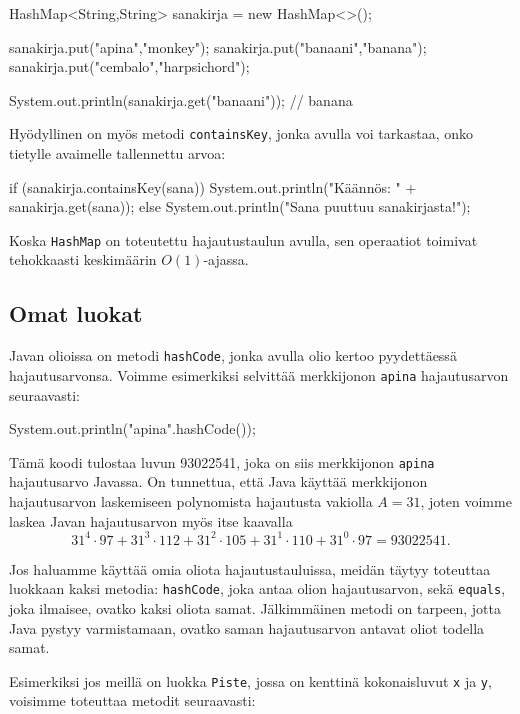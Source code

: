 \begin{code}
HashMap<String,String> sanakirja = new HashMap<>();

sanakirja.put("apina","monkey");
sanakirja.put("banaani","banana");
sanakirja.put("cembalo","harpsichord");

System.out.println(sanakirja.get("banaani")); // banana
\end{code}

Hyödyllinen on myös metodi \texttt{containsKey},
jonka avulla voi tarkastaa, onko tietylle avaimelle
tallennettu arvoa:

\begin{code}
if (sanakirja.containsKey(sana)) {
    System.out.println("Käännös: " + sanakirja.get(sana));
} else {
    System.out.println("Sana puuttuu sanakirjasta!");
}
\end{code}

Koska \texttt{HashMap} on toteutettu hajautustaulun avulla,
sen operaatiot toimivat tehokkaasti keskimäärin $O(1)$-ajassa.

\subsection{Omat luokat}

Javan olioissa on metodi \texttt{hashCode},
jonka avulla olio kertoo pyydettäessä hajautusarvonsa.
Voimme esimerkiksi selvittää merkkijonon \texttt{apina}
hajautusarvon seuraavasti:

\begin{code}
System.out.println("apina".hashCode());
\end{code}

Tämä koodi tulostaa luvun 93022541,
joka on siis merkkijonon \texttt{apina} hajautusarvo Javassa.
On tunnettua, että Java käyttää merkkijonon hajautusarvon laskemiseen
polynomista hajautusta vakiolla $A=31$,
joten voimme laskea Javan hajautusarvon myös itse kaavalla
\[31^4 \cdot 97+31^3 \cdot 112+31^2 \cdot 105+31^1 \cdot 110+31^0 \cdot 97=93022541.\]

Jos haluamme käyttää omia oliota hajautustauluissa,
meidän täytyy toteuttaa luokkaan kaksi metodia:
\texttt{hashCode}, joka antaa olion hajautusarvon,
sekä \texttt{equals},
joka ilmaisee, ovatko kaksi oliota samat.
Jälkimmäinen metodi on tarpeen,
jotta Java pystyy varmistamaan, ovatko saman hajautusarvon
antavat oliot todella samat.


Esimerkiksi jos meillä on luokka \texttt{Piste},
jossa on kenttinä kokonaisluvut \texttt{x} ja \texttt{y},
voisimme toteuttaa metodit seuraavasti:

